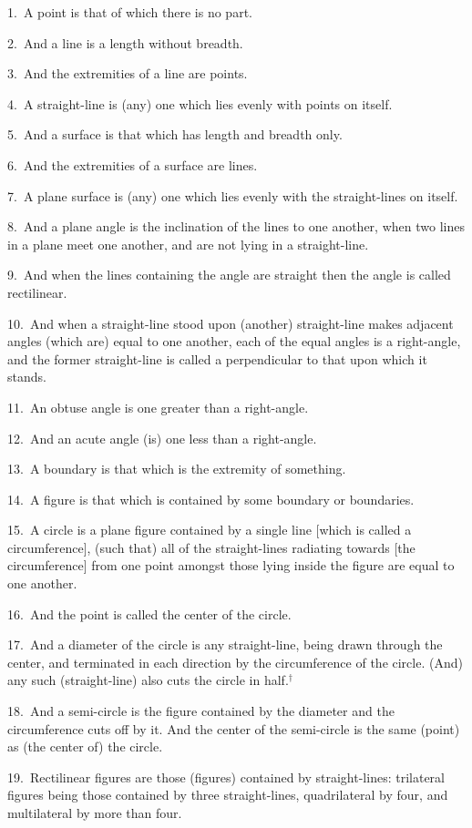 \begin{Parallel}{}{}
{1.~A point is that of which there is no part.

2.~And a line is a length without breadth.

3.~And the extremities of a line are points.

4.~A straight-line is (any) one which lies  evenly with points on itself.

5.~And a surface is that which has length and breadth only.

6.~And the extremities of a surface are lines.

7.~A plane surface is (any) one which lies evenly with the straight-lines on itself.

8.~And a plane angle is the inclination of the lines to one another, when two lines in a plane 
meet one another, and are not lying in a straight-line.

9.~And when the lines containing the angle are straight then the angle is called rectilinear.

10.~And when a straight-line stood upon (another) straight-line makes adjacent angles (which are) equal to one another, each of the equal angles is a
right-angle, and the former straight-line  is called a perpendicular to that upon which it stands.

11.~An obtuse angle is one greater than a right-angle.

12.~And an acute angle (is) one less than a right-angle.

13.~A boundary is that which is the extremity of something.

14.~A figure is that which is contained by some boundary or boundaries.

15.~A circle is a plane figure  contained by a single line [which is called a circumference], (such that) all of the straight-lines  radiating towards
 [the circumference] from one
point amongst those lying inside the figure  are equal to one another.

16.~And the point is called the center of the circle.

17.~And a diameter of the circle is any straight-line, being drawn through the
center, and terminated in each direction by the circumference of the circle. (And) any such (straight-line) also cuts the circle in half.$^\dag$

18.~And a semi-circle is the figure contained by the diameter  and
the circumference  cuts off by it. And the center of the semi-circle is the same (point)
as (the center of) the circle.

19.~Rectilinear figures are those (figures) contained by straight-lines: trilateral
figures being those contained by three straight-lines,  quadrilateral   by four,
and multilateral by more than four.

}
\end{Parallel}
